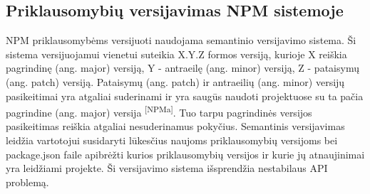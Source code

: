 \subsection{Priklausomybių versijavimas NPM sistemoje}

NPM priklausomybėms versijuoti naudojama semantinio versijavimo sistema. Ši sistema versijuojamui vienetui
suteikia X.Y.Z formos versiją, kurioje X reiškia pagrindinę (ang. major) versiją, Y - antraeilę (ang. minor) versiją,
Z - pataisymų (ang. patch) versiją. Pataisymų (ang. patch) ir antraeilių (ang. minor) versijų pasikeitimai yra atgaliai suderinami
ir yra saugūs naudoti projektuose su ta pačia pagrindine (ang. major) versija \textsuperscript{[NPMa]}.
Tuo tarpu pagrindinės versijos pasikeitimas reiškia atgaliai nesuderinamus pokyčius.
Semantinis versijavimas leidžia vartotojui susidaryti lūkesčius naujoms priklausomybių versijoms bei
package.json faile apibrėžti kurios priklausomybių versijos ir kurie jų atnaujinimai yra leidžiami projekte.
Ši versijavimo sistema išsprendžia nestabilaus API problemą.
